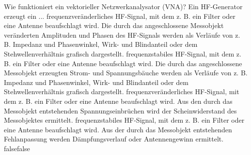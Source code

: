     {Wie funktioniert ein vektorieller Netzwerkanalysator (VNA)? Ein HF-Generator erzeugt ein ...}
    {frequenzveränderliches HF-Signal, mit dem z. B. ein Filter oder eine Antenne beaufschlagt wird. Die durch das angeschlossene Messobjekt veränderten Amplituden und Phasen des HF-Signals werden als Verläufe von z. B. Impedanz und Phasenwinkel, Wirk- und Blindanteil oder dem Stehwellenverhältnis grafisch dargestellt.}
    {frequenzstabiles HF-Signal, mit dem z. B. ein Filter oder eine Antenne beaufschlagt wird. Die durch das angeschlossene Messobjekt erzeugten Strom- und Spannungsbäuche werden als Verläufe von z. B. Impedanz und Phasenwinkel, Wirk- und Blindanteil oder dem Stehwellenverhältnis grafisch dargestellt.}
    {frequenzveränderliches HF-Signal, mit dem z. B. ein Filter oder eine Antenne beaufschlagt wird. Aus den durch das Messobjekt entstehenden Spannungseinbrüchen wird der Scheinwiderstand des Messobjektes ermittelt.}
    {frequenzstabiles HF-Signal, mit dem  z. B. ein Filter oder eine Antenne beaufschlagt wird. Aus der durch das Messobjekt entstehenden Fehlanpassung werden Dämpfungsverlauf oder Antennengewinn ermittelt.}
    {false}{false}